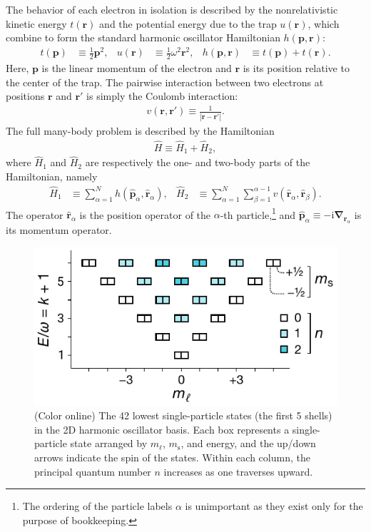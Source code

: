 The behavior of each electron in isolation is described by the nonrelativistic kinetic energy $t(\bm{r})$ and the potential energy due to the trap $u(\bm{r})$, which combine to form the standard harmonic oscillator Hamiltonian $h(\bm{p}, \bm{r})$:
\begin{align*}
  t(\bm{p}) &\equiv \frac{1}{2} \bm{p}^2, &
  u(\bm{r}) &\equiv \frac{1}{2} \omega^2 \bm{r}^2, &
  h(\bm{p}, \bm{r}) &\equiv t(\bm{p}) + t(\bm{r}).
\end{align*}
Here, $\bm{p}$ is the linear momentum of the electron and $\bm{r}$ is its position relative to the center of the trap.  The pairwise interaction between two electrons at positions $\bm{r}$ and $\bm{r}'$ is simply the Coulomb interaction:
\begin{align*}
  v(\bm{r}, \bm{r}') \equiv \frac{1}{|\bm{r} - \bm{r}'|}.
\end{align*}
The full many-body problem is described by the Hamiltonian
\begin{align*}
  \hat H \equiv \hat H_1 + \hat H_2,
\end{align*}
where $\hat{H}_1$ and $\hat{H}_2$ are respectively the one- and two-body parts of the Hamiltonian, namely
\begin{align} \label{eq:onetwobodyhamiltonian}
\hat{H}_1 &\equiv \sum_{\alpha = 1}^N h(\hat{\bm p}_\alpha, \hat{\bm r}_\alpha), &
\hat{H}_2 &\equiv \sum_{\alpha = 1}^N \sum_{\beta = 1}^{\alpha - 1} v(\hat{\bm r}_\alpha, \hat{\bm r}_\beta).
\end{align}
The operator $\hat{\bm r}_\alpha$ is the position operator of the $\alpha$-th particle,\footnote{The ordering of the particle labels $\alpha$ is unimportant as they exist only for the purpose of bookkeeping.} and $\hat{\bm p}_\alpha \equiv -\mathrm{i} \hat{\bm{\nabla}}_{\bm{r}_\alpha}$ is its momentum operator.

\begin{figure}
  \includegraphics{figures/fig-shell-structure-v2.pdf}
  \caption{(Color online) The 42 lowest single-particle states (the first 5 shells) in the 2D harmonic oscillator basis.  Each box represents a single-particle state arranged by $m_\ell$, $m_{\mathrm{s}}$, and energy, and the up/down arrows indicate the spin of the states.  Within each column, the principal quantum number $n$ increases as one traverses upward.}
  \label{fig:shell-structure}
\end{figure}

